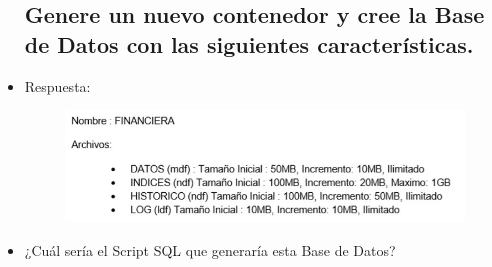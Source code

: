 \begin{itemize}
		\subsection{Genere un nuevo contenedor y cree la Base de Datos con las siguientes características.}
			\item Respuesta:
				\begin{figure}[htb]
					\begin{center}
						\includegraphics[width=16cm]{./Imagenes/Generar}
					\end{center}
				\end{figure}
			\item ¿Cuál sería el Script SQL que generaría esta Base de Datos?
	\end{itemize}